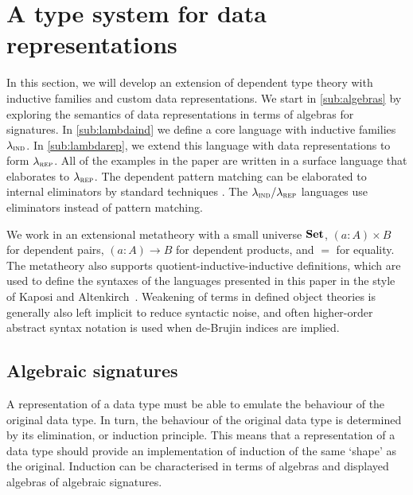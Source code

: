 \section{A type system for data representations}\label{sec:type-system}


In this section, we will develop an extension of dependent type theory with
inductive families and custom data representations. We start in
\cref{sub:algebras} by exploring the semantics of data representations in terms
of algebras for signatures. In \cref{sub:lambdaind}
we define a core language with inductive families $\lambda_{\textsc{ind}}$. In
\cref{sub:lambdarep}, we extend this language with data representations to form
$\lambda_{\textsc{rep}}$. All of the examples in the paper are written in a surface language
that elaborates to $\lambda_{\textsc{rep}}$. The dependent pattern matching can be
elaborated to internal eliminators by standard techniques
\cite{Goguen2006-sy,Cockx2018-fk}. The $\lambda_{\textsc{ind}}/\lambda_{\textsc{rep}}$ languages use eliminators instead
of pattern matching.

We work in an extensional metatheory with a small universe $\mathbf{Set}$, $(a : A)
\times B$ for dependent pairs, $(a : A) \to B$ for dependent products, and $=$
for equality. The metatheory also supports quotient-inductive-inductive
definitions, which are used to define the syntaxes of the languages presented in
this paper in the style of Kaposi and Altenkirch~\cite{Altenkirch2016-zc}.
Weakening of terms in defined object theories is generally also left implicit to
reduce syntactic noise, and often higher-order abstract syntax notation is used
when de-Brujin indices are implied.

\newcommand{\ValidCase}{\mta{ValidCase}}

\subsection{Algebraic signatures}

A representation of a data type must be able to emulate the behaviour of the
original data type. In turn, the behaviour of the original data type is
determined by its elimination, or induction principle. This means that a
representation of a data type should provide an implementation of induction of
the same `shape' as the original. Induction can be characterised in terms of
algebras and displayed algebras of algebraic signatures.

